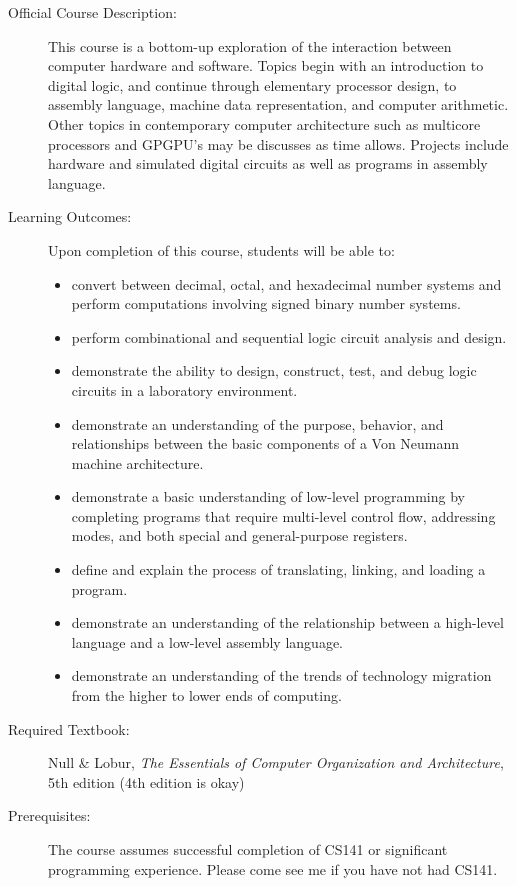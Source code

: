 \documentclass [letterpaper,11pt]{article}
\begin{document}
\begin{description}

\item[Official Course Description:]
This course is a bottom-up exploration of the interaction between computer hardware and software. Topics begin with an introduction to digital logic, and continue through elementary processor design, to assembly language, machine data representation, and computer arithmetic. Other topics in contemporary computer architecture such as multicore processors and GPGPU's may be discusses as time allows. Projects include hardware and simulated digital circuits as well as programs in assembly language.

\item[Learning Outcomes:] Upon completion of this course, students will be able to:
\begin{itemize} \setlength{\itemsep}{0em}\setlength{\parskip}{0pt}
	\item convert between decimal, octal, and hexadecimal number systems and perform computations involving signed binary number systems.
	\item perform combinational and sequential logic circuit analysis and design.
	\item demonstrate the ability to design, construct, test, and debug logic circuits in a laboratory environment.
	\item demonstrate an understanding of the purpose, behavior, and relationships between the basic components of a Von Neumann machine architecture.
	\item demonstrate a basic understanding of low-level programming by completing programs that require multi-level control flow, addressing modes, and both special and general-purpose registers.
	\item define and explain the process of translating, linking, and loading a program.
	\item demonstrate an understanding of the relationship between a high-level language and a low-level assembly language.
	\item demonstrate an understanding of the trends of technology migration from the higher to lower ends of computing.
	\end{itemize}


\item[Required Textbook:]
Null \& Lobur, \emph{The Essentials of Computer Organization and Architecture}, 5th edition (4th edition is okay)

\item[Prerequisites:]
The course assumes successful completion of CS141 or significant programming experience.  Please come see me if you have not had CS141.


\end{description}
\end{document}
